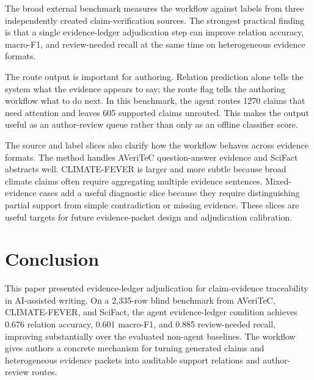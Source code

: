 \documentclass[11pt]{article}
\begin{document}
The broad external benchmark measures the workflow against labels from three independently created claim-verification sources. The strongest practical finding is that a single evidence-ledger adjudication step can improve relation accuracy, macro-F1, and review-needed recall at the same time on heterogeneous evidence formats.

The route output is important for authoring. Relation prediction alone tells the system what the evidence appears to say; the route flag tells the authoring workflow what to do next. In this benchmark, the agent routes 1270 claims that need attention and leaves 605 supported claims unrouted. This makes the output useful as an author-review queue rather than only as an offline classifier score.

The source and label slices also clarify how the workflow behaves across evidence formats. The method handles AVeriTeC question-answer evidence and SciFact abstracts well. CLIMATE-FEVER is larger and more subtle because broad climate claims often require aggregating multiple evidence sentences. Mixed-evidence cases add a useful diagnostic slice because they require distinguishing partial support from simple contradiction or missing evidence. These slices are useful targets for future evidence-packet design and adjudication calibration.

\section{Conclusion}

This paper presented evidence-ledger adjudication for claim-evidence traceability in AI-assisted writing. On a 2,335-row blind benchmark from AVeriTeC, CLIMATE-FEVER, and SciFact, the agent evidence-ledger condition achieves 0.676 relation accuracy, 0.601 macro-F1, and 0.885 review-needed recall, improving substantially over the evaluated non-agent baselines. The workflow gives authors a concrete mechanism for turning generated claims and heterogeneous evidence packets into auditable support relations and author-review routes.



\end{document}
